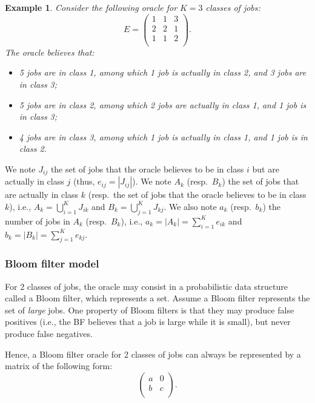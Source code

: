 \documentclass{article}
\newtheorem{example}{Example}
\begin{document}
\begin{example}
    Consider the following oracle for \(K=3\) classes of jobs:
    \[
        E=\begin{pmatrix}
            1 & 1 & 3 \\
            2 & 2 & 1 \\
            1 & 1 & 2 \\
        \end{pmatrix}.
    \]
    The oracle believes that:
    \begin{itemize}
        \item 5 jobs are in class 1, among which 1 job is actually in class 2, and 3 jobs are in class 3;
        \item 5 jobs are in class 2, among which 2 jobs are actually in class 1, and 1 job is in class 3;
        \item 4 jobs are in class 3, among which 1 job is actually in class 1, and 1 job is in class 2.
    \end{itemize}
\end{example}

We note \(J_{ij}\) the set of jobs that the oracle believes to be in class \(i\) but are actually in class \(j\) (thus,
\(e_{ij}=|J_{ij}|\)).
We note \(A_k\) (resp.\ \(B_k\)) the set of jobs that are actually in class \(k\) (resp.\ the set of jobs that the
oracle believes to be in class \(k\)), i.e., \(A_k=\bigcup_{i=1}^{K} J_{ik}\) and \(B_k=\bigcup_{j=1}^{K} J_{kj}\).
We also note \(a_k\) (resp.\ \(b_k\)) the number of jobs in \(A_k\) (resp.\ \(B_k\)), i.e.,
\(a_k=|A_k|=\sum_{i=1}^{K} e_{ik}\) and \(b_k=|B_k|=\sum_{j=1}^{K} e_{kj}\).

\subsubsection{Bloom filter model}

For 2 classes of jobs, the oracle may consist in a probabilistic data structure called a Bloom filter, which represents
a set. Assume a Bloom filter represents the set of \emph{large} jobs. One property of Bloom filters is that they may
produce false positives (i.e., the BF believes that a job is large while it is small), but never produce false
negatives.

Hence, a Bloom filter oracle for 2 classes of jobs can always be represented by a matrix of the following form:
\[
    \begin{pmatrix}
        a & 0 \\
        b & c \\
    \end{pmatrix}.
\]
\end{document}

